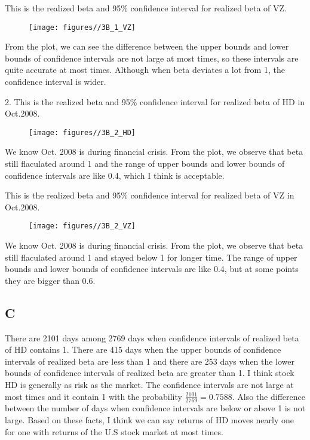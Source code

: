 \documentclass{report}
\begin{document}
This is the realized beta and 95\% confidence interval for realized beta of VZ.
\begin{figure}[H]
        \centering 
         \texttt{[image: figures//3B\_1\_VZ]}
\end{figure}
From the plot, we can see the difference between the upper bounds and lower bounds of confidence intervals are not large at most times, so these intervals are quite accurate at most times. Although when beta deviates a lot from 1, the confidence interval is wider.


2. This is the realized beta and 95\% confidence interval for realized beta of HD in Oct.2008. 
\begin{figure}[H]
        \centering 
         \texttt{[image: figures//3B\_2\_HD]}
\end{figure}
We know Oct. 2008 is during financial crisis. From the plot, we observe that beta still flaculated around 1 and the range of upper bounds and lower bounds of confidence intervals are like 0.4, which I think is acceptable.

This is the realized beta and 95\% confidence interval for realized beta of VZ in Oct.2008. 
\begin{figure}[H]
        \centering 
         \texttt{[image: figures//3B\_2\_VZ]}
\end{figure}
We know Oct. 2008 is during financial crisis. From the plot, we observe that beta still flaculated around 1 and stayed below 1 for longer time. The range of upper bounds and lower bounds of confidence intervals are like 0.4, but at some points they are bigger than 0.6.

\subsection{C}
There are 2101 days among 2769 days when confidence intervals of realized beta of HD contains 1. There are 415 days when the upper bounds of confidence intervals of realized beta are less than 1 and there are 253 days when the lower bounds of confidence intervals of realized beta are greater than 1. I think stock HD is generally as risk as the market. The confidence intervals are not large at most times and it contain 1 with the probability $ \frac{2101}{2769} = 0.7588 $. Also the difference between the number of days when confidence intervals are below or above 1 is not large. Based on these facts, I think we can say returns of HD moves nearly one for one with returns of the U.S stock market at most times. 
\end{document}
